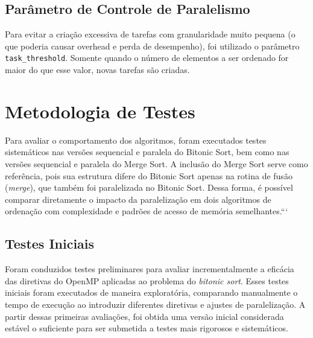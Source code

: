 \documentclass{article}
\begin{document}



\subsection{Parâmetro de Controle de Paralelismo}

Para evitar a criação excessiva de tarefas com granularidade muito pequena (o que poderia causar overhead e perda de desempenho), foi utilizado o parâmetro \texttt{task\_threshold}. Somente quando o número de elementos a ser ordenado for maior do que esse valor, novas tarefas são criadas.


\section{Metodologia de Testes}

Para avaliar o comportamento dos algoritmos, foram executados testes sistemáticos nas versões sequencial e paralela do Bitonic Sort, bem como nas versões sequencial e paralela do Merge Sort. A inclusão do Merge Sort serve como referência, pois sua estrutura difere do Bitonic Sort apenas na rotina de fusão (\emph{merge}), que também foi paralelizada no Bitonic Sort. Dessa forma, é possível comparar diretamente o impacto da paralelização em dois algoritmos de ordenação com complexidade e padrões de acesso de memória semelhantes.```


\subsection{Testes Iniciais}

Foram conduzidos testes preliminares para avaliar incrementalmente a eficácia das diretivas do OpenMP aplicadas ao problema do \textit{bitonic sort}. Esses testes iniciais foram executados de maneira exploratória, comparando manualmente o tempo de execução ao introduzir diferentes diretivas e ajustes de paralelização. A partir dessas primeiras avaliações, foi obtida uma versão inicial considerada estável o suficiente para ser submetida a testes mais rigorosos e sistemáticos.
\end{document}
